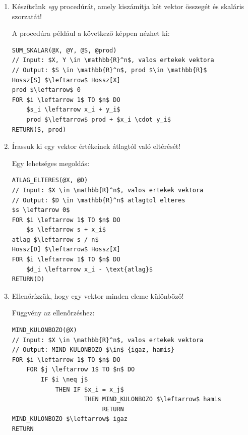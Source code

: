 \documentclass[a4paper]{article}
\newenvironment{solution}
{\color{RoyalBlue}}{\bigskip}
\begin{document}
\begin{enumerate}
Vizsgáljuk meg a monoton, és szigorúan monoton eseteket is!

\begin{solution}
A szigorúan monoton esethez csak annyi változtatásra van szükség, hogy a feltételben a $>$ reláció helyett $\geq$ szerepeljen.
\end{solution}

\item

Készítsünk \textit{egy} procedúrát, amely kiszámítja két vektor összegét és skaláris szorzatát!

\begin{solution}
A procedúra például a következő képpen nézhet ki:
\begin{lstlisting}[mathescape]
SUM_SKALAR(@X, @Y, @S, @prod)
// Input: $X, Y \in \mathbb{R}^n$, valos ertekek vektora
// Output: $S \in \mathbb{R}^n$, prod $\in \mathbb{R}$
Hossz[S] $\leftarrow$ Hossz[X]
prod $\leftarrow$ 0
FOR $i \leftarrow 1$ TO $n$ DO
	$s_i \leftarrow x_i + y_i$
	prod $\leftarrow$ prod + $x_i \cdot y_i$
RETURN(S, prod)
\end{lstlisting}
\end{solution}

\item

Írassuk ki egy vektor értékeinek átlagtól való eltérését!

\begin{solution}
Egy lehetséges megoldás:
\begin{lstlisting}[mathescape]
ATLAG_ELTERES(@X, @D)
// Input: $X \in \mathbb{R}^n$, valos ertekek vektora
// Output: $D \in \mathbb{R}^n$ atlagtol elteres
$s \leftarrow 0$
FOR $i \leftarrow 1$ TO $n$ DO
    $s \leftarrow s + x_i$
atlag $\leftarrow s / n$
Hossz[D] $\leftarrow$ Hossz[X]
FOR $i \leftarrow 1$ TO $n$ DO
    $d_i \leftarrow x_i - \text{atlag}$	
RETURN(D)
\end{lstlisting}
\end{solution}

\item

Ellenőrízzük, hogy egy vektor minden eleme különböző!

\begin{solution}
Függvény az ellenőrzéshez:
\begin{lstlisting}[mathescape]
MIND_KULONBOZO(@X)
// Input: $X \in \mathbb{R}^n$, valos ertekek vektora
// Output: MIND_KULONBOZO $\in$ {igaz, hamis}
FOR $i \leftarrow 1$ TO $n$ DO
    FOR $j \leftarrow 1$ TO $n$ DO
        IF $i \neq j$
            THEN IF $x_i = x_j$
                    THEN MIND_KULONBOZO $\leftarrow$ hamis
                         RETURN
MIND_KULONBOZO $\leftarrow$ igaz
RETURN
\end{lstlisting}
\end{solution}


\end{enumerate}
\end{document}
